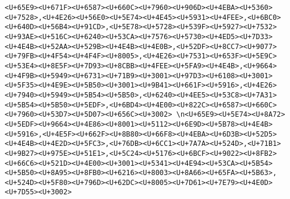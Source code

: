 \documentclass[
]{article}
\begin{document}
\begin{verbatim}
<U+65E9><U+671F><U+6587><U+660C><U+7960><U+906D><U+4EBA><U+5360><U+7528>,<U+4E26><U+56E0><U+5E74><U+4E45><U+5931><U+4FEE>,<U+6BC0><U+640D><U+56B4><U+91CD>,<U+5E78><U+5728><U+539F><U+5927><U+7532><U+93AE><U+516C><U+6240><U+53CA><U+7576><U+5730><U+4ED5><U+7D33><U+4E4B><U+52AA><U+529B><U+4E4B><U+4E0B>,<U+52DF><U+8CC7><U+9077><U+79FB><U+4F54><U+4F4F><U+8005>,<U+4E26><U+7531><U+653F><U+5E9C><U+53E4><U+8E5F><U+7D93><U+8CBB><U+4FEE><U+5FA9><U+4E4B>,<U+9664><U+4F9B><U+5949><U+6731><U+71B9><U+3001><U+97D3><U+6108><U+3001><U+5F35><U+4E9E><U+5B50><U+3001><U+9B41><U+661F><U+5916>,<U+4E26><U+7940><U+5949><U+5B54><U+5B50>,<U+6240><U+4EE5><U+53C8><U+7A31><U+5B54><U+5B50><U+5EDF>,<U+6BD4><U+4E00><U+822C><U+6587><U+660C><U+7960><U+53D7><U+5D07><U+656C><U+3002> \n<U+65E9><U+5E74><U+8A72><U+5EDF><U+9664><U+4E86><U+8001><U+5112><U+6E9D><U+5B78><U+4E4B><U+5916>,<U+4E5F><U+662F><U+8B80><U+66F8><U+4EBA><U+6D3B><U+52D5><U+4E4B><U+4E2D><U+5FC3>,<U+76DB><U+6CC1><U+7A7A><U+524D>,<U+71B1><U+9B27><U+975E><U+51E1>,<U+5C24><U+5176><U+6BCF><U+9022><U+8FB2><U+66C6><U+521D><U+4E00><U+3001><U+5341><U+4E94><U+53CA><U+5B54><U+5B50><U+8A95><U+8FB0><U+6216><U+8003><U+8A66><U+65FA><U+5B63>,<U+524D><U+5F80><U+796D><U+62DC><U+8005><U+7D61><U+7E79><U+4E0D><U+7D55><U+3002>

\end{verbatim}
\end{document}
